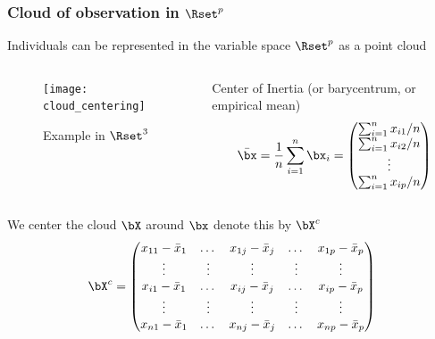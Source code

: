\documentclass{beamer}\usepackage[]{graphicx}\usepackage[]{color}
\begin{document}
\begin{frame}
  \frametitle{Cloud of observation in $\Rset^p$}

  Individuals can be represented in the \alert{variable space $\Rset^p$} as a point cloud

  \begin{columns}
    \begin{column}{.5\textwidth}
      \begin{figure}      
      \texttt{[image: cloud\_centering]}
      \vspace{-.25cm}
      \caption{Example in $\Rset^3$}
      \end{figure}      
    \end{column}

  \begin{column}{.5\textwidth}
    \begin{block}{Center of Inertia}
      (or barycentrum, or empirical mean)
      \[ \bar{\bx} = \frac{1}{n} \sum _{i=1}^n \bx_i = 
      \begin{pmatrix}
        \sum _{i=1}^n x_{i1}/n \\
        \sum _{i=1}^n x_{i2}/n \\
        \vdots\\
        \sum _{i=1}^n x_{ip}/n
      \end{pmatrix}
      \]
    \end{block}
  \end{column}
  \end{columns}

  We center the cloud $\bX$ around $\bx$ denote this by $\bX^c$
  \begin{equation*}
    \bX^c = \begin{pmatrix}
    x_{11} - \bar{x}_1 &   \dots & x_{1j}  - \bar{x}_j & \dots  & x_{1p} - \bar{x}_p   \cr
              \vdots   &  \vdots & \vdots              & \vdots & \vdots  \cr
    x_{i1} - \bar{x}_1 &   \dots & x_{ij} - \bar{x}_j  & \dots  & x_{ip}  - \bar{x}_p \cr
              \vdots   &  \vdots & \vdots              & \vdots & \vdots  \cr
    x_{n1} - \bar{x}_1 &  \dots  & x_{nj} - \bar{x}_j  & \dots  & x_{np}  - \bar{x}_p \cr
    \end{pmatrix}
  \end{equation*}

\end{frame}
\end{document}

